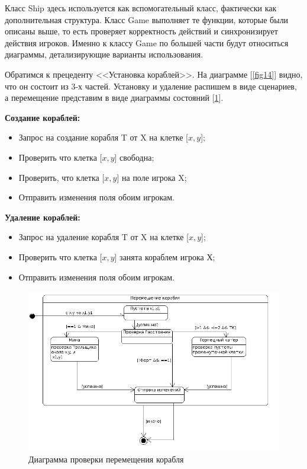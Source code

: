 Класс Ship здесь используется как вспомогательный класс, фактически как дополнительная структура. Класс Game выполняет те функции, которые были описаны выше, то есть проверяет корректность действий и синхронизирует действия игроков. Именно к классу Game по большей части будут относиться диаграммы, детализирующие варианты использования.

Обратимся к прецеденту <<Установка кораблей>>. На диаграмме [\ref{fig14}] видно, что он состоит из 3-х частей. Установку и удаление распишем в виде сценариев, а перемещение представим в виде диаграммы состояний [\ref{fig16}].  


\textbf{Создание кораблей:}
	
		\begin{itemize}		
			\item Запрос на создание корабля T от X на клетке [$x,y$];		
			\item Проверить что клетка [$x,y$] свободна;
			\item Проверить, что клетка [$x,y$] на поле игрока X;
			\item Отправить изменения поля обоим игрокам.		
		\end{itemize}


\textbf{Удаление кораблей:}

		\begin{itemize}		
			\item Запрос на удаление корабля T от X на клетке [$x,y$];		
			\item Проверить что клетка [$x,y$] занята кораблем игрока Х;
		\item Отправить изменения поля обоим игрокам.	
		\end{itemize}


\begin{figure}[htp]
\centering
\includegraphics[width=16cm]{images/statemove.png}
\caption{Диаграмма проверки перемещения корабля}
\label{fig16}
\end{figure}

